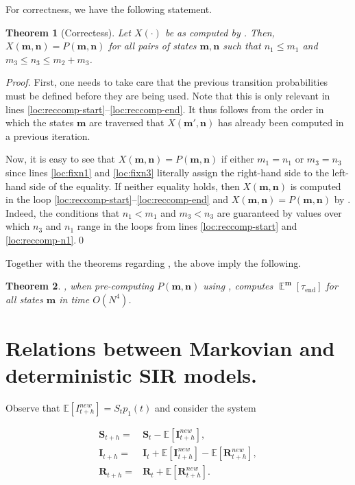 \documentclass[a4paper,preprint]{elsarticle}
\newtheorem{theorem}{Theorem}
\newcommand{\htime}{\tau_\mathrm{end}}
\renewcommand{\vec}[1]{\boldsymbol{#1}}
\DeclareMathOperator{\Ex}{\mathbb{E}}
\begin{document}
For correctness, we have the following statement.
\begin{theorem}[Correctess]
    Let $X(\cdot)$ be as computed by . Then, $X(\vec{m}, \vec{n}) = P(\vec{m},\vec{n})$ for all pairs of states $\vec{m}, \vec{n}$ such that $n_1 \leq m_1$ and $m_3 \leq n_3 \leq m_2 + m_3$.
\end{theorem}
\begin{proof}
    First, one needs to take care that the previous transition probabilities must be defined before they are being used. Note that this is only relevant in lines \ref{loc:reccomp-start}--\ref{loc:reccomp-end}. It thus follows from the order in which the states $\vec{m}$ are traversed that $X(\vec{m'},\vec{n})$ has already been computed in a previous iteration.
    
    Now, it is easy to see that $X(\vec{m},\vec{n}) = P(\vec{m},\vec{n})$ if either $m_1 = n_1$ or $m_3 = n_3$ since lines \ref{loc:fixn1} and \ref{loc:fixn3} literally assign the right-hand side to the left-hand side of the equality. If neither equality holds, then $X(\vec{m},\vec{n})$ is computed in the loop \ref{loc:reccomp-start}--\ref{loc:reccomp-end} and $X(\vec{m},\vec{n}) = P(\vec{m},\vec{n})$ by . Indeed, the conditions that $n_1 < m_1$ and $m_3 < n_3$ are guaranteed by values over which $n_3$ and $n_1$ range in the loops from lines \ref{loc:reccomp-start} and \ref{loc:reccomp-n1}.\qed
\end{proof}

Together with the theorems regarding , the above imply the following.
\begin{theorem}
    , when pre-computing $P(\vec{m},\vec{n})$ using , computes $\Ex^{\vec{m}}[\htime]$ for all states $\vec{m}$ in time $O(N^4)$.
\end{theorem}

\section{Relations between Markovian and deterministic SIR models.}

Observe that 
$\mathbb{E}[I_{t+h}^{new}]=S_t p_1(t)$ and consider the system

\begin{align}
    \vec{S}_{t+h} = {} & \vec{S}_{t} - \mathbb{E}[\vec{I}_{t+h}^{new}], \label{eq:esperanzaS}\\
    \vec{I}_{t+h} = {} & \vec{I}_{t} + \mathbb{E}[\vec{I}_{t+h}^{new}] - \mathbb{E}[\vec{R}_{t+h}^{new}],\label{eq:esperanzaI}\\
    \vec{R}_{t+h} = {} & \vec{R}_{t} + \mathbb{E}[\vec{R}_{t+h}^{new}]. \label{eq:esperanzaR}
\end{align}
\end{document}
